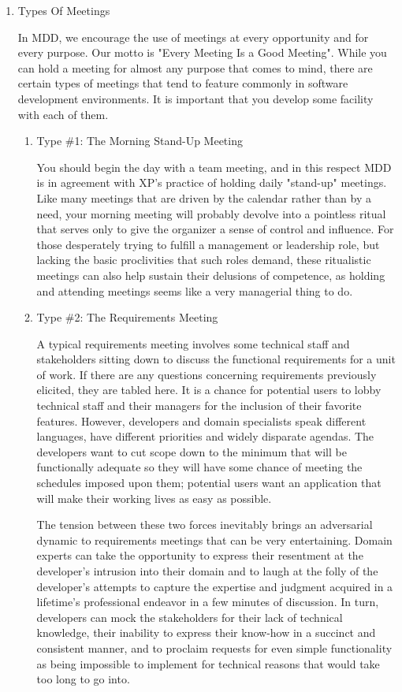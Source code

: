 \documentclass{article}
\begin{document}
\begin{enumerate}
\item Types Of Meetings
\label{sec:orgheadline186}

In MDD, we encourage the use of meetings at every opportunity and for
every purpose. Our motto is "Every Meeting Is a Good Meeting". While you
can hold a meeting for almost any purpose that comes to mind, there are
certain types of meetings that tend to feature commonly in software
development environments. It is important that you develop some facility
with each of them.

\begin{enumerate}
\item Type \#1: The Morning Stand-Up Meeting
\label{sec:orgheadline181}

You should begin the day with a team meeting, and in this respect MDD is
in agreement with XP's practice of holding daily "stand-up" meetings.
Like many meetings that are driven by the calendar rather than by a
need, your morning meeting will probably devolve into a pointless ritual
that serves only to give the organizer a sense of control and influence.
For those desperately trying to fulfill a management or leadership role,
but lacking the basic proclivities that such roles demand, these
ritualistic meetings can also help sustain their delusions of
competence, as holding and attending meetings seems like a very
managerial thing to do.

\item Type \#2: The Requirements Meeting
\label{sec:orgheadline182}

A typical requirements meeting involves some technical staff and
stakeholders sitting down to discuss the functional requirements for a
unit of work. If there are any questions concerning requirements
previously elicited, they are tabled here. It is a chance for potential
users to lobby technical staff and their managers for the inclusion of
their favorite features. However, developers and domain specialists
speak different languages, have different priorities and widely
disparate agendas. The developers want to cut scope down to the minimum
that will be functionally adequate so they will have some chance of
meeting the schedules imposed upon them; potential users want an
application that will make their working lives as easy as possible.

The tension between these two forces inevitably brings an adversarial
dynamic to requirements meetings that can be very entertaining. Domain
experts can take the opportunity to express their resentment at the
developer's intrusion into their domain and to laugh at the folly of the
developer's attempts to capture the expertise and judgment acquired in a
lifetime's professional endeavor in a few minutes of discussion. In
turn, developers can mock the stakeholders for their lack of technical
knowledge, their inability to express their know-how in a succinct and
consistent manner, and to proclaim requests for even simple
functionality as being impossible to implement for technical reasons
that would take too long to go into.


\end{enumerate}
\end{enumerate}
\end{document}
